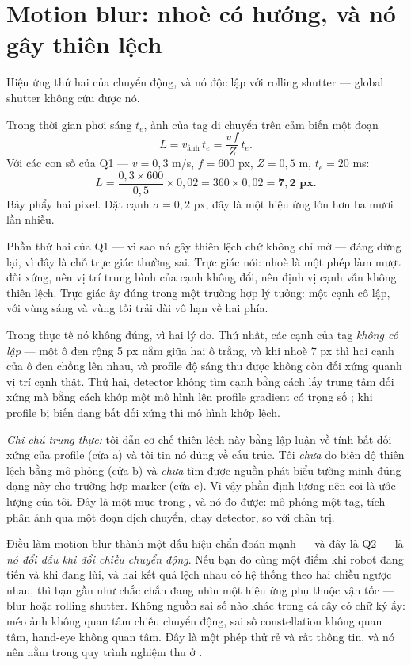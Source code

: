 \documentclass[../../marker.tex]{subfiles}
\begin{document}
\section{Motion blur: nhoè có hướng, và nó gây thiên lệch}

Hiệu ứng thứ hai của chuyển động, và nó độc lập với rolling shutter --- global shutter không cứu được nó.

Trong thời gian phơi sáng \(t_e\), ảnh của tag di chuyển trên cảm biến một đoạn
\[
L = v_{\text{ảnh}}\,t_e = \frac{v\,f}{Z}\,t_e .
\]
Với các con số của Q1 --- \(v = 0{,}3\) m/s, \(f = 600\) px, \(Z = 0{,}5\) m, \(t_e = 20\) ms:
\[
L = \frac{0{,}3 \times 600}{0{,}5} \times 0{,}02 = 360 \times 0{,}02 = \mathbf{7{,}2 \text{ px}}.
\]
Bảy phẩy hai pixel. Đặt cạnh \(\sigma = 0{,}2\) px, đây là một hiệu ứng lớn hơn ba mươi lần nhiễu.

Phần thứ hai của Q1 --- vì sao nó gây thiên lệch chứ không chỉ mờ --- đáng dừng lại, vì đây là chỗ trực giác thường sai. Trực giác nói: nhoè là một phép làm mượt đối xứng, nên vị trí trung bình của cạnh không đổi, nên định vị cạnh vẫn không thiên lệch. Trực giác ấy đúng trong một trường hợp lý tưởng: một cạnh cô lập, với vùng sáng và vùng tối trải dài vô hạn về hai phía.

Trong thực tế nó không đúng, vì hai lý do. Thứ nhất, các cạnh của tag \emph{không cô lập} --- một ô đen rộng 5 px nằm giữa hai ô trắng, và khi nhoè 7 px thì hai cạnh của ô đen chồng lên nhau, và profile độ sáng thu được không còn đối xứng quanh vị trí cạnh thật. Thứ hai, detector không tìm cạnh bằng cách lấy trung tâm đối xứng mà bằng cách khớp một mô hình lên profile gradient có trọng số \cite{wang2016apriltag2}; khi profile bị biến dạng bất đối xứng thì mô hình khớp lệch.

\emph{Ghi chú trung thực:} tôi dẫn cơ chế thiên lệch này bằng lập luận về tính bất đối xứng của profile (cửa a) và tôi tin nó đúng về cấu trúc. Tôi \emph{chưa} đo biên độ thiên lệch bằng mô phỏng (cửa b) và \emph{chưa} tìm được nguồn phát biểu tường minh đúng dạng này cho trường hợp marker (cửa c). Vì vậy phần định lượng nên coi là ước lượng của tôi. Đây là một mục trong , và nó đo được: mô phỏng một tag, tích phân ảnh qua một đoạn dịch chuyển, chạy detector, so với chân trị.

Điều làm motion blur thành một dấu hiệu chẩn đoán mạnh --- và đây là Q2 --- là \emph{nó đổi dấu khi đổi chiều chuyển động}. Nếu bạn đo cùng một điểm khi robot đang tiến và khi đang lùi, và hai kết quả lệch nhau có hệ thống theo hai chiều ngược nhau, thì bạn gần như chắc chắn đang nhìn một hiệu ứng phụ thuộc vận tốc --- blur hoặc rolling shutter. Không nguồn sai số nào khác trong cả cây có chữ ký ấy: méo ảnh không quan tâm chiều chuyển động, sai số constellation không quan tâm, hand-eye không quan tâm. Đây là một phép thử rẻ và rất thông tin, và nó nên nằm trong quy trình nghiệm thu ở .
\end{document}
